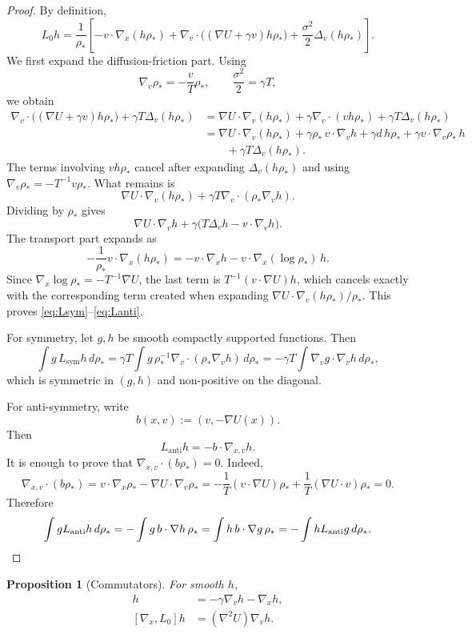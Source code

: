 \documentclass[11pt]{article}
\newtheorem{proposition}[theorem]{Proposition}
\theoremstyle{definition}
\theoremstyle{remark}
\begin{document}
\begin{proof}
By definition,
\[
L_0 h
=
\frac{1}{\rho_*}\left[
-v\cdot \nabla_x(h\rho_*)
+\nabla_v\cdot\bigl((\nabla U+\gamma v)h\rho_*\bigr)
+\frac{\sigma^2}{2}\Delta_v(h\rho_*)
\right].
\]
We first expand the diffusion-friction part. Using
\[
\nabla_v \rho_*=-\frac{v}{T}\rho_*,
\qquad
\frac{\sigma^2}{2}=\gamma T,
\]
we obtain
\begin{align*}
\nabla_v\cdot\bigl((\nabla U+\gamma v)h\rho_*\bigr)
+\gamma T\Delta_v(h\rho_*)
&=
\nabla U\cdot \nabla_v(h\rho_*)+\gamma\nabla_v\cdot(vh\rho_*)+\gamma T\Delta_v(h\rho_*)\\
&=
\nabla U\cdot \nabla_v(h\rho_*)
+\gamma \rho_*\,v\cdot \nabla_v h
+\gamma d\,h\rho_*
+\gamma v\cdot \nabla_v\rho_*\,h\\
&\qquad
+\gamma T\Delta_v(h\rho_*).
\end{align*}
The terms involving $v h\rho_*$ cancel after expanding
$\Delta_v(h\rho_*)$ and using $\nabla_v \rho_* = -T^{-1}v\rho_*$. What remains
is
\[
\nabla U\cdot \nabla_v(h\rho_*)
+\gamma T\nabla_v\cdot(\rho_*\nabla_v h).
\]
Dividing by $\rho_*$ gives
\[
\nabla U\cdot \nabla_v h+\gamma\bigl(T\Delta_v h-v\cdot \nabla_v h\bigr).
\]
The transport part expands as
\[
-\frac{1}{\rho_*}v\cdot \nabla_x(h\rho_*)
=
-v\cdot \nabla_x h-v\cdot \nabla_x(\log \rho_*)\,h.
\]
Since $\nabla_x \log \rho_*=-T^{-1}\nabla U$, the last term is
$T^{-1}(v\cdot \nabla U)h$, which cancels exactly with the corresponding term
created when expanding $\nabla U\cdot \nabla_v(h\rho_*)/\rho_*$. This proves
\eqref{eq:Lsym}--\eqref{eq:Lanti}.

For symmetry, let $g,h$ be smooth compactly supported functions. Then
\[
\int g\,L_{\mathrm{sym}}h\,d\rho_*
=
\gamma T\int g\,\rho_*^{-1}\nabla_v\cdot(\rho_*\nabla_v h)\,d\rho_*
=
-\gamma T\int \nabla_v g\cdot \nabla_v h\,d\rho_*,
\]
which is symmetric in $(g,h)$ and non-positive on the diagonal.

For anti-symmetry, write
\[
b(x,v):=(v,-\nabla U(x)).
\]
Then
\[
L_{\mathrm{anti}}h=-b\cdot \nabla_{x,v}h.
\]
It is enough to prove that $\nabla_{x,v}\cdot (b\rho_*)=0$. Indeed,
\[
\nabla_{x,v}\cdot (b\rho_*)
=
v\cdot \nabla_x \rho_*-\nabla U\cdot \nabla_v \rho_*
=
-\frac{1}{T}(v\cdot \nabla U)\rho_*+\frac{1}{T}(\nabla U\cdot v)\rho_*=0.
\]
Therefore
\[
\int gL_{\mathrm{anti}}h\,d\rho_*
=
-\int g\,b\cdot \nabla h\,\rho_*
=
\int h\,b\cdot \nabla g\,\rho_*
=
-\int hL_{\mathrm{anti}}g\,d\rho_*.
\qedhere
\]
\end{proof}

\begin{proposition}[Commutators]\label{prop:comm}
For smooth $h$,
\begin{align}
[\nabla_v,L_0]h&=-\gamma \nabla_v h-\nabla_x h,
\label{eq:comm-v}\\
[\nabla_x,L_0]h&=(\nabla^2 U)\nabla_v h.
\label{eq:comm-x}
\end{align}
\end{proposition}
\end{document}
